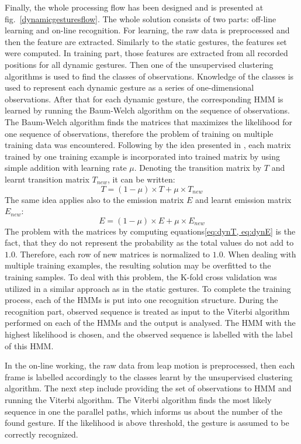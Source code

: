 Finally, the whole processing flow has been designed and is presented at fig.~\ref{dynamicgesturesflow}.
The whole solution consists of two parts: off-line learning and on-line recognition.
For learning, the raw data is preprocessed and then the feature are extracted. 
Similarly to the static gestures, the features set were computed. 
In training part, those features are extracted from all recorded positions for all dynamic gestures.
Then one of the unsupervised clustering algorithms is used to find the classes of observations.
Knowledge of the classes is used to represent each dynamic gesture as a series of one-dimensional observations.
After that for each dynamic gesture, the corresponding HMM is learned by running the Baum-Welch algorithm on the sequence of observations.
The Baum-Welch algorithm finds the matrices that maximizes the likelihood for one sequence of observations, therefore the problem of training on multiple training data was encountered.
Following by the idea presented in \cite{hmmtutorial}, each matrix trained by one training example is incorporated into trained matrix by using simple addition with learning rate $\mu$.
Denoting the transition matrix by $T$ and learnt transition matrix $T_{new}$, it can be written:
\begin{equation}\label{eq:dynT}
T = (1-\mu) \times T + \mu \times T_{new}
\end{equation}
The same idea applies also to the emission matrix $E$ and learnt emission matrix $E_{new}$:
\begin{equation}\label{eq:dynE}
E = (1-\mu) \times E + \mu \times E_{new}
\end{equation}
The problem with the matrices by computing equations\ref{eq:dynT, eq:dynE} is the fact, that they do not represent the probability as the total values do not add to $1.0$.
Therefore, each row of new matrices is normalized to $1.0$.
When dealing with multiple training examples, the resulting solution may be overfitted to the training samples.
To deal with this problem, the K-fold cross validation was utilized in a similar approach as in the static gestures.
To complete the training process, each of the HMMs is put into one recognition structure. 
During the recognition part, observed sequence is treated as input to the Viterbi algorithm performed on each of the HMMs and the output is analysed.
The HMM with the highest likelihood is chosen, and the observed sequence is labelled with the label of this HMM.

In the on-line working, the raw data from leap motion is preprocessed, then each frame is labelled accordingly to the classes learnt by the unsupervised clustering algorithm.
The next step include providing the set of observations to HMM and running the Viterbi algorithm.
The Viterbi algorithm finds the most likely sequence in one the parallel paths, which informs us about the number of the found gesture. 
If the likelihood is above threshold, the gesture is assumed to be correctly recognized.


